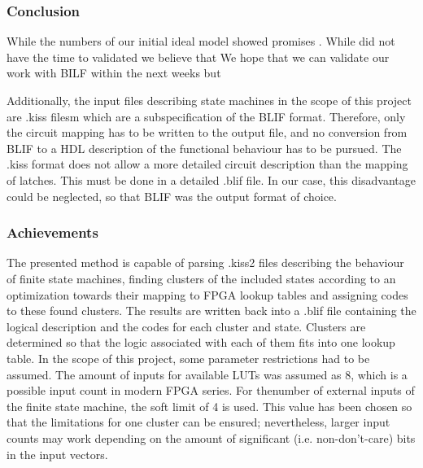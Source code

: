 \newpage
\subsubsection{Conclusion}
\label{subsubsec:Conclusion}

While the numbers of our initial ideal model showed promises .
While did not have the time to validated we believe that We hope that we can validate our work with BILF within the next weeks but 



Additionally, the input files describing state machines in the scope of this project are .kiss filesm which are a subspecification of the BLIF format. Therefore, only the circuit mapping has to be written to the output file, and no conversion from BLIF to a HDL description of the functional behaviour has to be pursued. The .kiss format does not allow a more detailed circuit description than the mapping of latches. This must be done in a detailed .blif file. In our case, this disadvantage could be neglected, so that BLIF was the output format of choice.

\subsubsection{Achievements}
\label{subsubsec:Achievements}

The presented method is capable of parsing .kiss2 files describing the behaviour of finite state machines, finding clusters of the included states
according to an optimization towards their mapping to FPGA lookup tables and assigning codes to these found clusters. The results are written back into a .blif file containing the logical description and the codes for each cluster and state. Clusters are determined so that the logic associated with each of them fits into one lookup table. In the scope of this project, some parameter restrictions had to be assumed. The amount of inputs for available LUTs was assumed as 8, which is a possible input count in modern FPGA series. For thenumber of external inputs of the finite state machine, the soft limit of 4 is used. This value has been chosen so that the limitations for one cluster can be ensured; nevertheless, larger input counts may work depending on the amount of significant (i.e. non-don't-care) bits in the input vectors.
